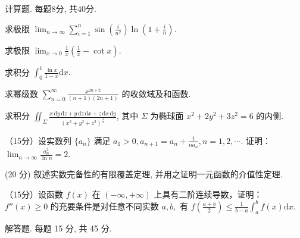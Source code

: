 \par{}
计算题. 每题8分, 共40分.\par
求极限 $\lim_{n\to \infty}\sum_{i = 1}^{n}\sin \left(\frac{i}{n^2}\right)\ln \left(1 + \frac{i}{n}\right).$\par
求极限 $\lim_{x\to 0}\frac{1}{x}\left(\frac{1}{x} -\cot x\right).$\par
求积分 $\int_0^1\frac{\ln x}{1 - x}\mathrm{d}x.$\par
求幂级数 $\sum_{n=0}^{\infty} \frac{x^{2n+2}}{(n+1)(2n+1)}$ 的收敛域及和函数.\par
求积分 $\iint_{\Sigma} \frac{x \, \mathrm{d}y \, \mathrm{d}z + y \, \mathrm{d}z \, \mathrm{d}x + z \, \mathrm{d}x \, \mathrm{d}y}{(x^2 + y^2 + z^2)^{\frac{3}{2}}}$, 其中 $\Sigma$ 为椭球面 $x^2 + 2y^2 + 3z^2 = 6$ 的内侧.\par
\par{}
（15分）设实数列 $\{a_{n}\}$ 满足 $a_1 > 0, a_{n+1} = a_n + \frac{1}{na_n}, n = 1,2,\cdots$. 证明：$\lim_{n\to \infty}\frac{a_n^2}{\ln n} = 2.$\par
\par{}
(20 分) 叙述实数完备性的有限覆盖定理, 并用之证明一元函数的介值性定理.\par
\par{}
（15分）设函数 $f(x)$ 在 $(- \infty, + \infty)$ 上具有二阶连续导数，证明：$f''(x) \geq 0$ 的充要条件是对任意不同实数 $a, b,$ 有 $f\left(\frac{a + b}{2}\right) \leq \frac{1}{b - a} \int_{a}^{b} f(x) \mathrm{d}x.$\par
\par{}
解答题. 每题 15 分, 共 45 分.\par
